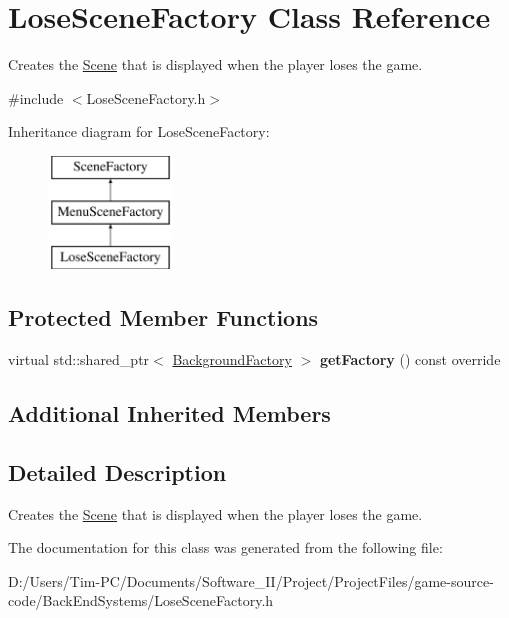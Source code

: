\hypertarget{class_lose_scene_factory}{}\section{Lose\+Scene\+Factory Class Reference}
\label{class_lose_scene_factory}


Creates the \hyperlink{class_scene}{Scene} that is displayed when the player loses the game.  




{\ttfamily \#include $<$Lose\+Scene\+Factory.\+h$>$}

Inheritance diagram for Lose\+Scene\+Factory\+:\begin{figure}[H]
\begin{center}
\leavevmode
\includegraphics[height=3.000000cm]{dd/d0c/class_lose_scene_factory}
\end{center}
\end{figure}
\subsection*{Protected Member Functions}
\begin{DoxyCompactItemize}
\item 
\mbox{\label{class_lose_scene_factory_adfe18ba674cdd988bb78e3cd3218796f}} 
virtual std\+::shared\+\_\+ptr$<$ \hyperlink{class_background_factory}{Background\+Factory} $>$ {\bfseries get\+Factory} () const override
\end{DoxyCompactItemize}
\subsection*{Additional Inherited Members}


\subsection{Detailed Description}
Creates the \hyperlink{class_scene}{Scene} that is displayed when the player loses the game. 

The documentation for this class was generated from the following file\+:\begin{DoxyCompactItemize}
\item 
D\+:/\+Users/\+Tim-\/\+P\+C/\+Documents/\+Software\+\_\+\+I\+I/\+Project/\+Project\+Files/game-\/source-\/code/\+Back\+End\+Systems/Lose\+Scene\+Factory.\+h\end{DoxyCompactItemize}
